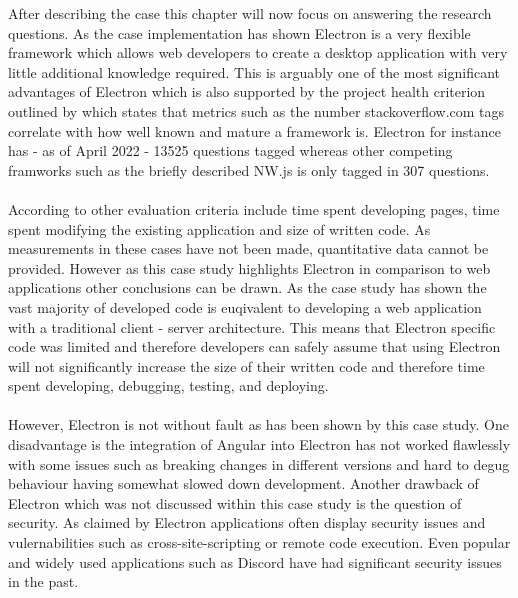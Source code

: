 
After describing the case this chapter will now focus on answering the research questions.
As the case implementation has shown Electron is a very flexible framework 
which allows web developers to create a desktop application with very little 
additional knowledge required. 
This is arguably one of the most significant advantages of Electron which is 
also supported by the project health criterion outlined by \textcite{ratingsFW} 
which states that metrics such as the number stackoverflow.com tags correlate 
with how well known and mature a framework is. \parencite{backEndComparison}
Electron for instance has - as of April 2022 - 13525 questions tagged whereas
other competing framworks such as the briefly described NW.js is only tagged 
in 307 questions.\paragraph{}
According to \textcite{frameworksEfficiency} other evaluation criteria include
time spent developing pages, time spent modifying the existing application and size
of written code. 
As measurements in these cases have not been made, quantitative data cannot 
be provided. 
However as this case study highlights Electron in comparison to web applications
other conclusions can be drawn.
As the case study has shown the vast majority of developed code is euqivalent to 
developing a web application with a traditional client - server architecture. 
This means that Electron specific code was limited and therefore developers can 
safely assume that using Electron will not significantly increase the size of 
their written code and therefore time spent developing, debugging, testing, and
deploying. \paragraph{}
However, Electron is not without fault as has been shown by this case study.
One disadvantage is the integration of Angular into Electron has not worked flawlessly 
with some issues such as breaking changes in different versions and hard to 
degug behaviour having somewhat slowed down development. 
Another drawback of Electron which was not discussed within this case study 
is the question of security. 
As claimed by \textcite{frameworksSecurity} Electron applications often display 
security issues and vulernabilities such as cross-site-scripting or remote code execution.
Even popular and widely used applications such as Discord have had significant 
security issues in the past. \parencite{discordVulernabilities}\paragraph{}
